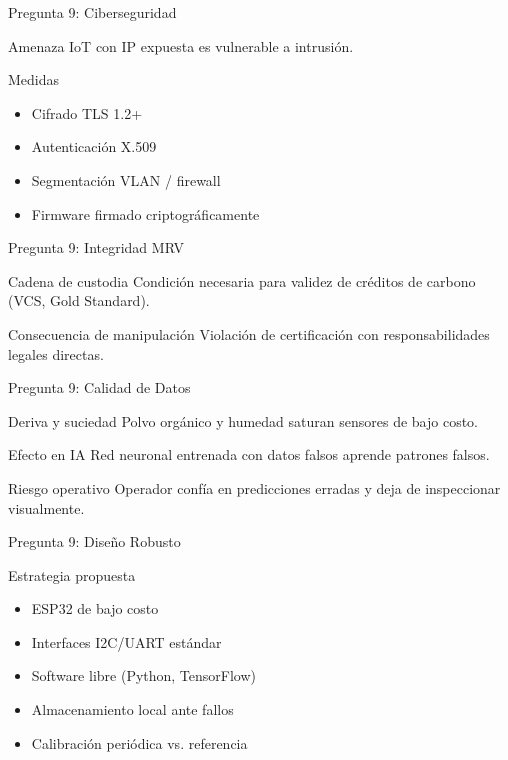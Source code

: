 \documentclass[aspectratio=169, 11pt]{beamer}
\begin{document}
\begin{frame}{Pregunta 9: Ciberseguridad}
\begin{alertblock}{Amenaza}
\footnotesize
IoT con IP expuesta es vulnerable a intrusión.
\end{alertblock}
\begin{block}{Medidas}
\footnotesize
\begin{itemize}
    \item Cifrado TLS 1.2+
    \item Autenticación X.509
    \item Segmentación VLAN / firewall
    \item Firmware firmado criptográficamente
\end{itemize}
\end{block}
\end{frame}

\begin{frame}{Pregunta 9: Integridad MRV}
\begin{alertblock}{Cadena de custodia}
\footnotesize
Condición necesaria para validez de créditos de carbono (VCS, Gold Standard).
\end{alertblock}
\begin{block}{Consecuencia de manipulación}
\footnotesize
Violación de certificación con responsabilidades legales directas.
\end{block}
\end{frame}

\begin{frame}{Pregunta 9: Calidad de Datos}
\begin{alertblock}{Deriva y suciedad}
\footnotesize
Polvo orgánico y humedad saturan sensores de bajo costo.
\end{alertblock}
\begin{block}{Efecto en IA}
\footnotesize
Red neuronal entrenada con datos falsos aprende patrones falsos.
\end{block}
\begin{alertblock}{Riesgo operativo}
\footnotesize
Operador confía en predicciones erradas y deja de inspeccionar visualmente.
\end{alertblock}
\end{frame}

\begin{frame}{Pregunta 9: Diseño Robusto}
\begin{exampleblock}{Estrategia propuesta}
\footnotesize
\begin{itemize}
    \item ESP32 de bajo costo
    \item Interfaces I2C/UART estándar
    \item Software libre (Python, TensorFlow)
    \item Almacenamiento local ante fallos
    \item Calibración periódica vs. referencia
\end{itemize}
\end{exampleblock}
\end{frame}
\end{document}
